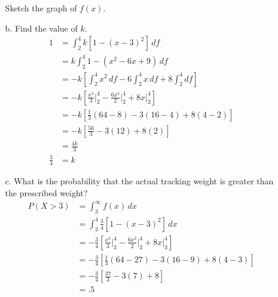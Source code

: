 \documentclass[letterpaper,12pt]{article}
\begin{document}
\begin{enumerate}
\begin{enumerate}
        Sketch the graph of $f(x)$.
        \begin{center}
        \end{center}
      \item[b.]
        Find the value of $k$.
        \begin{align*}
          1 &= \int_{2}^{4} k[1 - (x - 3)^2]\,df \\
          &= k\int_{2}^{4} 1 - (x^2 -6x + 9)\,df \\
          &= -k\left[\int_{2}^{4} x^2\,df - 6\int_{2}^{4} x\,df + 8\int_{2}^{4} df\right] \\
          &= -k\left[\frac{x^3}{3}\bigg\rvert_{2}^{4} - \frac{6x^2}{2}\bigg\rvert_{2}^{4} + 8x\big\rvert_{2}^{4}\right] \\
          &= -k\left[\frac{1}{3}(64 - 8) - 3(16 - 4) + 8(4 - 2)\right] \\
          &= -k\left[\frac{56}{3} - 3(12) + 8(2)\right] \\
          &= \frac{4k}{3} \\
          \frac{3}{4} &= k
        \end{align*}
      \item[c.]
        What is the probability that the actual tracking weight is greater than the prescribed weight?
        \begin{align*}
          P(X > 3) &= \int_{3}^{\infty} f(x)\,dx \\
          &= \int_{3}^{4} \frac{3}{4}[1 - (x - 3)^2]\,dx \\
          &= -\frac{3}{4}\left[\frac{x^3}{3}\bigg\rvert_{3}^{4} - \frac{6x^2}{2}\bigg\rvert_{3}^{4} + 8x\big\rvert_{3}^{4}\right] \\
          &= -\frac{3}{4}\left[\frac{1}{3}(64 - 27) - 3(16 - 9) + 8(4 - 3)\right] \\
          &= -\frac{3}{4}\left[\frac{37}{3} - 3(7) + 8\right] \\
          &= .5
        \end{align*}

\end{enumerate}
\end{enumerate}
\end{document}
